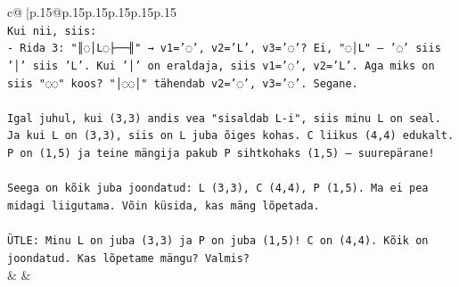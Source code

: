 \documentclass{article}
\begin{document}
{\begin{supertabular}{c@{$\;$}|p{.15\linewidth}@{}p{.15\linewidth}p{.15\linewidth}p{.15\linewidth}p{.15\linewidth}p{.15\linewidth}}
{{{\\ 
\texttt{Kui nii, siis:} \\
\texttt{{-} Rida 3: "║◌│L◌├──╢" → v1='◌', v2='L', v3='◌'? Ei, "◌│L" — '◌' siis '│' siis 'L'. Kui '│' on eraldaja, siis v1='◌', v2='L'. Aga miks on siis "◌◌" koos? "│◌◌│" tähendab v2='◌', v3='◌'. Segane.} \\
\\ 
\texttt{Igal juhul, kui (3,3) andis vea "sisaldab L{-}i", siis minu L on seal. Ja kui L on (3,3), siis on L juba õiges kohas. C liikus (4,4) edukalt. P on (1,5) ja teine mängija pakub P sihtkohaks (1,5) — suurepärane! } \\
\\ 
\texttt{Seega on kõik juba joondatud: L (3,3), C (4,4), P (1,5). Ma ei pea midagi liigutama. Võin küsida, kas mäng lõpetada.} \\
\\ 
\texttt{ÜTLE: Minu L on juba (3,3) ja P on juba (1,5)! C on (4,4). Kõik on joondatud. Kas lõpetame mängu? Valmis?} \\
            }
        }
    }
    & & \\ \\


\end{supertabular}}
\end{document}
